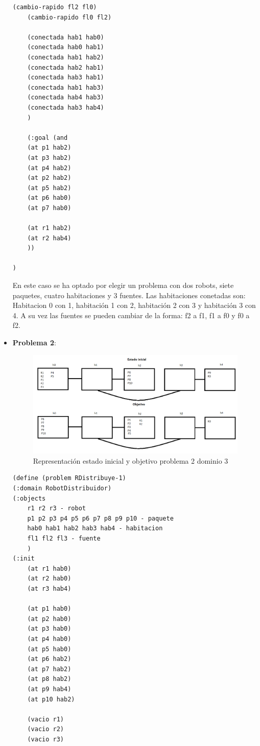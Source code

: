 \begin{itemize}
\begin{lstlisting}[language=SH]
	(cambio-rapido fl2 fl0)
	(cambio-rapido fl0 fl2)
	
	(conectada hab1 hab0)
	(conectada hab0 hab1)
	(conectada hab1 hab2)
	(conectada hab2 hab1)
	(conectada hab3 hab1)
	(conectada hab1 hab3)
	(conectada hab4 hab3)
	(conectada hab3 hab4)
	)
	
	(:goal (and
	(at p1 hab2)
	(at p3 hab2)
	(at p4 hab2)
	(at p2 hab2)
	(at p5 hab2)
	(at p6 hab0)
	(at p7 hab0)
	
	(at r1 hab2)
	(at r2 hab4)
	))

)

	\end{lstlisting}
	
En este caso se ha optado por elegir un problema con dos robots, siete paquetes, cuatro habitaciones y 3 fuentes. Las habitaciones conetadas son: Habitacion 0 con 1, habitación 1 con 2, habitación 2 con 3 y habitación 3 con 4. A su vez las fuentes se pueden cambiar de la forma: f2 a f1, f1 a f0 y f0 a f2.
\newpage
	\item \textbf{Problema 2}:
	
	\begin{figure}[h]
		\centering
		\includegraphics[width=1\linewidth]{p3-2}
		\caption{Representación estado inicial y objetivo problema 2 dominio 3}
		\label{fig:p1}
	\end{figure}
	
	\begin{lstlisting}[language=SH]
(define (problem RDistribuye-1)
(:domain RobotDistribuidor)
(:objects
	r1 r2 r3 - robot
	p1 p2 p3 p4 p5 p6 p7 p8 p9 p10 - paquete
	hab0 hab1 hab2 hab3 hab4 - habitacion
	fl1 fl2 fl3 - fuente
	)
(:init
	(at r1 hab0)
	(at r2 hab0)
	(at r3 hab4)
	
	(at p1 hab0)
	(at p2 hab0)
	(at p3 hab0)
	(at p4 hab0)
	(at p5 hab0)
	(at p6 hab2)
	(at p7 hab2)
	(at p8 hab2)
	(at p9 hab4)
	(at p10 hab2)

	(vacio r1)
	(vacio r2)
	(vacio r3)


\end{lstlisting}
\end{itemize}

